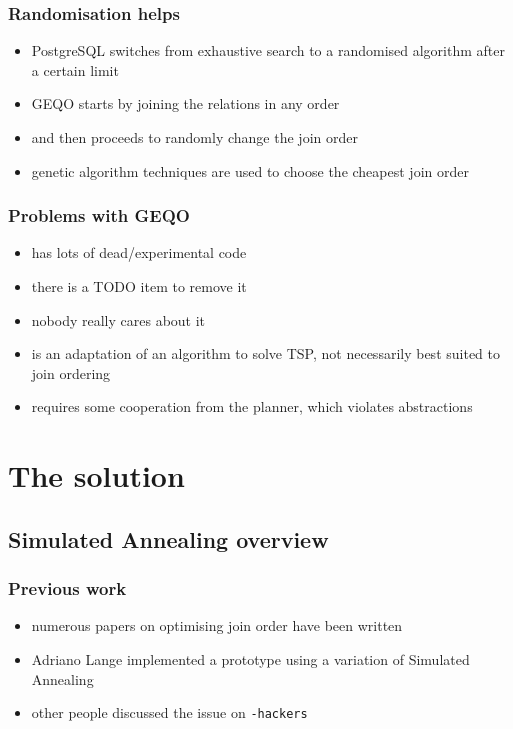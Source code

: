 \documentclass{beamer}
\begin{document}
\begin{frame}
  \frametitle{Randomisation helps}

  \begin{itemize}
  \item PostgreSQL switches from exhaustive search to a randomised algorithm
    after a certain limit
  \item GEQO starts by joining the relations in any order
  \item and then proceeds to randomly change the join order
  \item genetic algorithm techniques are used to choose the cheapest join order
  \end{itemize}
\end{frame}

\begin{frame}
  \frametitle{Problems with GEQO}

  \begin{itemize}
  \item has lots of dead/experimental code
  \item there is a TODO item to remove it
  \item nobody really cares about it
  \item is an adaptation of an algorithm to solve TSP, not necessarily best
    suited to join ordering
  \item requires some cooperation from the planner, which violates abstractions
  \end{itemize}
\end{frame}

\section{The solution}

\subsection{Simulated Annealing overview}

\begin{frame}
  \frametitle{Previous work}

  \begin{itemize}
  \item numerous papers on optimising join order have been written
  \item Adriano Lange implemented a prototype using a variation of Simulated
    Annealing
  \item other people discussed the issue on \texttt{-hackers}
  \end{itemize}

\end{frame}
\end{document}
